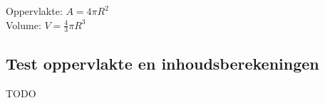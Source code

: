 

		
\begin{ftonthoud}
			Oppervlakte: $A=4\pi R^2$
		\\
		Volume: $V=\frac{4}{3}\pi R^3$
\end{ftonthoud}


\subsection{Test oppervlakte en inhoudsberekeningen}
TODO